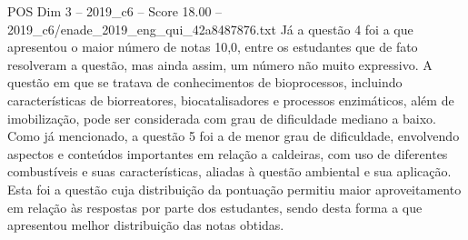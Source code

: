\begin{textsample}{POS Dim 3 – 2019\_c6 – Score 18.00 – 2019\_c6/enade\_2019\_eng\_qui\_42a8487876.txt}
Já a questão 4 foi a que apresentou o maior número de notas 10,0, entre os estudantes que de fato resolveram a questão, mas ainda assim, um número não muito expressivo.
A questão em que se tratava de conhecimentos de bioprocessos, incluindo características de biorreatores, biocatalisadores e processos enzimáticos, além de imobilização, pode ser considerada com grau de dificuldade mediano a baixo.
Como já mencionado, a questão 5 foi a de menor grau de dificuldade, envolvendo aspectos e conteúdos importantes em relação a caldeiras, com uso de diferentes combustíveis e suas características, aliadas à questão ambiental e sua aplicação.
Esta foi a questão cuja distribuição da pontuação permitiu maior aproveitamento em relação às respostas por parte dos estudantes, sendo desta forma a que apresentou melhor distribuição das notas obtidas.

\end{textsample}
